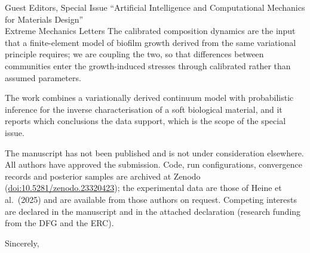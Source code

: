 \documentclass[11pt,a4paper]{letter}
\begin{document}
\begin{letter}{Guest Editors, Special Issue ``Artificial Intelligence and Computational Mechanics for Materials Design''\\
Extreme Mechanics Letters}
The calibrated composition dynamics are the input that a finite-element model of biofilm growth derived from the same variational principle requires; we are coupling the two, so that differences between communities enter the growth-induced stresses through calibrated rather than assumed parameters.

The work combines a variationally derived continuum model with probabilistic inference for the inverse characterisation of a soft biological material, and it reports which conclusions the data support, which is the scope of the special issue.

The manuscript has not been published and is not under consideration elsewhere.
All authors have approved the submission.
Code, run configurations, convergence records and posterior samples are archived at Zenodo (\href{https://doi.org/10.5281/zenodo.23320423}{doi:10.5281/zenodo.23320423}); the experimental data are those of Heine et al.\ (2025) and are available from those authors on request.
Competing interests are declared in the manuscript and in the attached declaration (research funding from the DFG and the ERC).

\closing{Sincerely,}

\end{letter}
\end{document}
